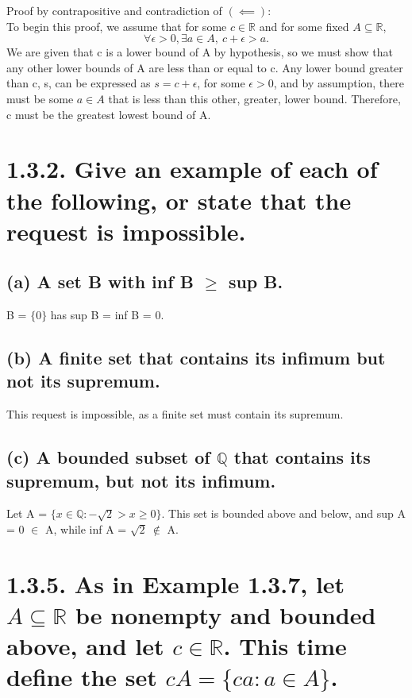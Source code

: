\documentclass[12pt,letterpaper]{article}
\begin{document}
	Proof by contrapositive and contradiction of \((\impliedby)\): \\
	
	To begin this proof, we assume that for some \(c \in \mathbb{R}\) and for some fixed \(A \subseteq \mathbb{R}\), \[\forall \epsilon > 0, \exists a \in A,\ c + \epsilon > a.\]  We are given that c is a lower bound of A by hypothesis, so we must show that any other lower bounds of A are less than or equal to c. Any lower bound greater than c, s, can be expressed as \(s = c + \epsilon\), for some \(\epsilon > 0\), and by assumption, there must be some \(a \in A\) that is less than this other, greater, lower bound. Therefore, c must be the greatest lowest bound of A.
	
\section{1.3.2. Give an example of each of the following, or state that the request is impossible.}

\subsection{(a) A set B with inf B \(\geq\) sup B.}

	B = \(\{0\}\) has sup B = inf B = 0.
	
\subsection{(b) A finite set that contains its infimum but not its supremum.}

	This request is impossible, as a finite set must contain its supremum.
	
\subsection{(c) A bounded subset of \(\mathbb{Q}\) that contains its supremum, but not its infimum.}

	Let A = \(\{x \in \mathbb{Q} : -\sqrt{2} > x \geq 0\}\). This set is bounded above and below, and sup A = 0 \(\in\) A, while inf A = \(\sqrt{2}\ \notin\) A.
	
\section{1.3.5. As in Example 1.3.7, let \(A \subseteq \mathbb{R}\) be nonempty and bounded above, and let \(c \in \mathbb{R}\). This time define the set \(cA = \{ca : a \in A\}\).}
\end{document}
